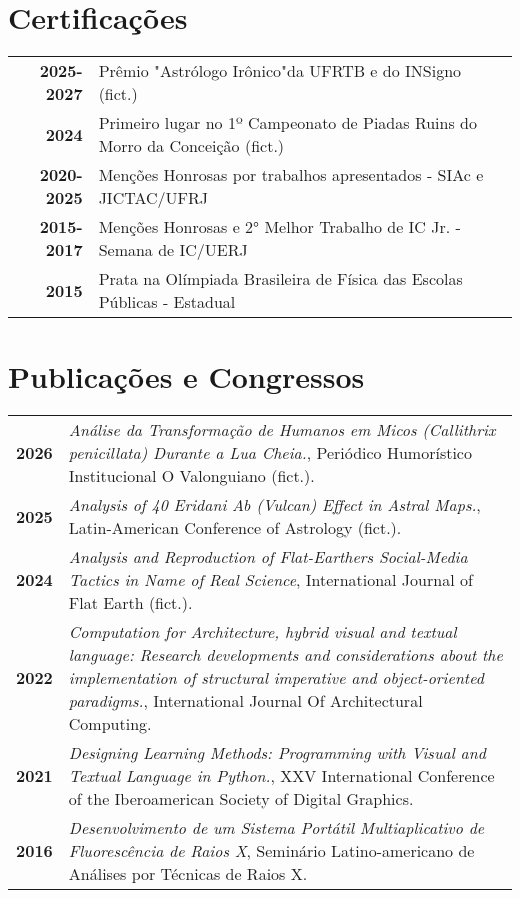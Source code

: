 \documentclass[darkhipster]{simplehipstercv}
\begin{document}
\begin{paracol}{2}
\newpage

\begin{minipage}[t]{0.33\textwidth}

\section*{Certificações}
\begin{tabular}{>{\footnotesize\bfseries}r | >{\footnotesize}p{}}
    2025-2027 & Prêmio "Astrólogo Irônico"\space da UFRTB e do INSigno (fict.) \\
    2024 & Primeiro lugar no 1º Campeonato de Piadas Ruins do Morro da Conceição (fict.) \\
    2020-2025 & Menções Honrosas por trabalhos apresentados - SIAc e JICTAC/UFRJ \\
    2015-2017 & Menções Honrosas e 2° Melhor Trabalho de IC Jr. - Semana de IC/UERJ \\
    2015 & Prata na Olímpiada Brasileira de Física das Escolas Públicas - Estadual
\end{tabular}
\end{minipage}\hfill
\begin{minipage}[t]{0.33\textwidth}
\section*{Publicações e Congressos}
\begin{tabular}{>{\footnotesize\bfseries}r | >{\footnotesize}p{}}
        2026 & \emph{Análise da Transformação de Humanos em Micos (Callithrix penicillata) Durante a Lua Cheia.}, Periódico Humorístico Institucional O Valonguiano (fict.). \\
     	2025 & \emph{Analysis of 40 Eridani Ab (Vulcan) Effect in Astral Maps.}, Latin-American Conference of Astrology (fict.). \\
        2024 & \emph{Analysis and Reproduction of Flat-Earthers Social-Media Tactics in Name of Real Science}, International Journal of Flat Earth (fict.). \\
        2022 & \emph{Computation for Architecture, hybrid visual and textual language: Research developments and considerations about the implementation of structural imperative and object-oriented paradigms.}, International Journal Of Architectural Computing. \\
        2021 & \emph{Designing Learning Methods: Programming with Visual and Textual Language in Python.}, XXV International Conference of the Iberoamerican Society of Digital Graphics. \\
        2016 & \emph{Desenvolvimento de um Sistema Portátil Multiaplicativo de Fluorescência de Raios X}, Seminário Latino-americano de Análises por Técnicas de Raios X. \\

\end{tabular}
\end{minipage}\hfill

\newpage

\end{paracol}
\end{document}
